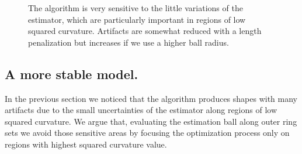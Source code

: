 \documentclass[smallextended]{svjour3}       %
\newcommand{\jaco}[1]{{\textcolor{green!50!black}{#1}}}
\begin{document}
\begin{figure}[!h]
\begin{minipage}[b]{0.33\textwidth}
{	}%
\end{minipage}%
\begin{minipage}[b]{0.33\textwidth}
\end{minipage}%
\caption{The algorithm is very sensitive to the little variations of the estimator, which are particularly important in regions of low squared curvature. Artifacts are somewhat reduced with a length penalization but increases if we use a higher ball radius. }
\label{fig:m1-square-flow}
\end{figure}


\subsection{A more stable model.}
In the previous section we noticed that the algorithm produces shapes with many artifacts due to the small uncertainties
of the estimator along regions of low squared curvature. We argue that, evaluating the estimation ball along outer
ring sets we avoid those sensitive areas by focusing the optimization process only on regions with highest squared
curvature value.

\end{document}
